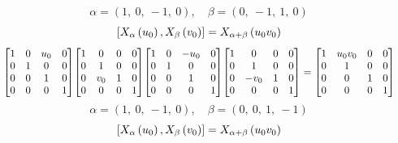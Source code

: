 \documentclass[11pt]{article}
\theoremstyle{definition}
\begin{document}
\[
\alpha = \left( 1, \  0, \  -1, \  0\right), \quad \beta = \left( 0, \  -1, \  1, \  0\right)
\]
\[
\scaletoalign{\textwidth}{\left[ X_{\alpha}\left(u_{0}\right), X_{\beta}\left(v_{0}\right) \right] = X_{\alpha + \beta}\left(u_{0} v_{0}\right)}
\]
\[
\scaletoalign{\textwidth}{{\left[\begin{matrix}1 & 0 & u_{0} & 0\\0 & 1 & 0 & 0\\0 & 0 & 1 & 0\\0 & 0 & 0 & 1\end{matrix}\right]} {\left[\begin{matrix}1 & 0 & 0 & 0\\0 & 1 & 0 & 0\\0 & v_{0} & 1 & 0\\0 & 0 & 0 & 1\end{matrix}\right]} {\left[\begin{matrix}1 & 0 & - u_{0} & 0\\0 & 1 & 0 & 0\\0 & 0 & 1 & 0\\0 & 0 & 0 & 1\end{matrix}\right]} {\left[\begin{matrix}1 & 0 & 0 & 0\\0 & 1 & 0 & 0\\0 & - v_{0} & 1 & 0\\0 & 0 & 0 & 1\end{matrix}\right]} = {\left[\begin{matrix}1 & u_{0} v_{0} & 0 & 0\\0 & 1 & 0 & 0\\0 & 0 & 1 & 0\\0 & 0 & 0 & 1\end{matrix}\right]}}
\]
\[
\alpha = \left( 1, \  0, \  -1, \  0\right), \quad \beta = \left( 0, \  0, \  1, \  -1\right)
\]
\[
\scaletoalign{\textwidth}{\left[ X_{\alpha}\left(u_{0}\right), X_{\beta}\left(v_{0}\right) \right] = X_{\alpha + \beta}\left(u_{0} v_{0}\right)}
\]
\end{document}
